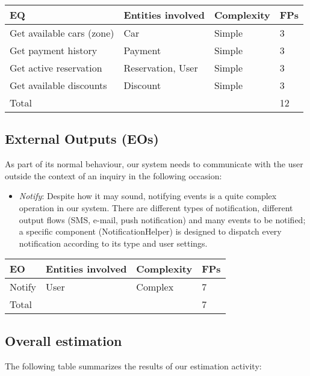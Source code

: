 \begin{table}[H]
	\centering
	\begin{tabular}{|l|l|l|l|}
		\hline
		EQ & Entities involved & Complexity & FPs \\
		\hline
		Get available cars (zone) & Car & Simple & 3 \\
		Get payment history & Payment & Simple & 3 \\
		Get active reservation & Reservation, User & Simple & 3 \\
		Get available discounts & Discount & Simple & 3 \\
		\hline
		\multicolumn{3}{|l|}{Total} & 12 \\
		\hline
	\end{tabular}
\end{table}

\subsection{External Outputs (EOs)}
As part of its normal behaviour, our system needs to communicate with the user outside the context of an inquiry in the following occasion:
\begin{itemize}
	\item \emph{Notify}: Despite how it may sound, notifying events is a quite complex operation in our system. There are different types of notification, different output flows (SMS, e-mail, push notification) and many events to be notified; a specific component (NotificationHelper) is designed to dispatch every notification according to its type and user settings.
\end{itemize}

\begin{table}[H]
	\centering
	\begin{tabular}{|l|l|l|l|}
		\hline
		EO & Entities involved & Complexity & FPs \\
		\hline
		Notify & User & Complex & 7 \\
		\hline
		\multicolumn{3}{|l|}{Total} & 7 \\
		\hline
	\end{tabular}
\end{table}

\subsection{Overall estimation}
The following table summarizes the results of our estimation activity:

